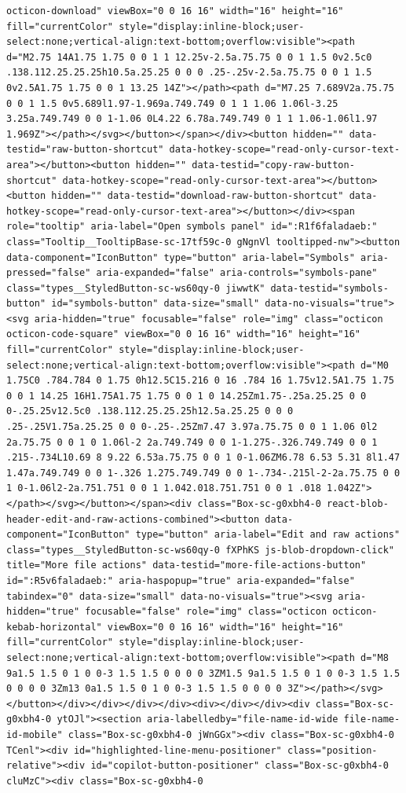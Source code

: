 \documentclass[
  letterpaper,
]{book}
\begin{document}
\begin{verbatim}
octicon-download" viewBox="0 0 16 16" width="16" height="16" fill="currentColor" style="display:inline-block;user-select:none;vertical-align:text-bottom;overflow:visible"><path d="M2.75 14A1.75 1.75 0 0 1 1 12.25v-2.5a.75.75 0 0 1 1.5 0v2.5c0 .138.112.25.25.25h10.5a.25.25 0 0 0 .25-.25v-2.5a.75.75 0 0 1 1.5 0v2.5A1.75 1.75 0 0 1 13.25 14Z"></path><path d="M7.25 7.689V2a.75.75 0 0 1 1.5 0v5.689l1.97-1.969a.749.749 0 1 1 1.06 1.06l-3.25 3.25a.749.749 0 0 1-1.06 0L4.22 6.78a.749.749 0 1 1 1.06-1.06l1.97 1.969Z"></path></svg></button></span></div><button hidden="" data-testid="raw-button-shortcut" data-hotkey-scope="read-only-cursor-text-area"></button><button hidden="" data-testid="copy-raw-button-shortcut" data-hotkey-scope="read-only-cursor-text-area"></button><button hidden="" data-testid="download-raw-button-shortcut" data-hotkey-scope="read-only-cursor-text-area"></button></div><span role="tooltip" aria-label="Open symbols panel" id=":R1f6faladaeb:" class="Tooltip__TooltipBase-sc-17tf59c-0 gNgnVl tooltipped-nw"><button data-component="IconButton" type="button" aria-label="Symbols" aria-pressed="false" aria-expanded="false" aria-controls="symbols-pane" class="types__StyledButton-sc-ws60qy-0 jiwwtK" data-testid="symbols-button" id="symbols-button" data-size="small" data-no-visuals="true"><svg aria-hidden="true" focusable="false" role="img" class="octicon octicon-code-square" viewBox="0 0 16 16" width="16" height="16" fill="currentColor" style="display:inline-block;user-select:none;vertical-align:text-bottom;overflow:visible"><path d="M0 1.75C0 .784.784 0 1.75 0h12.5C15.216 0 16 .784 16 1.75v12.5A1.75 1.75 0 0 1 14.25 16H1.75A1.75 1.75 0 0 1 0 14.25Zm1.75-.25a.25.25 0 0 0-.25.25v12.5c0 .138.112.25.25.25h12.5a.25.25 0 0 0 .25-.25V1.75a.25.25 0 0 0-.25-.25Zm7.47 3.97a.75.75 0 0 1 1.06 0l2 2a.75.75 0 0 1 0 1.06l-2 2a.749.749 0 0 1-1.275-.326.749.749 0 0 1 .215-.734L10.69 8 9.22 6.53a.75.75 0 0 1 0-1.06ZM6.78 6.53 5.31 8l1.47 1.47a.749.749 0 0 1-.326 1.275.749.749 0 0 1-.734-.215l-2-2a.75.75 0 0 1 0-1.06l2-2a.751.751 0 0 1 1.042.018.751.751 0 0 1 .018 1.042Z"></path></svg></button></span><div class="Box-sc-g0xbh4-0 react-blob-header-edit-and-raw-actions-combined"><button data-component="IconButton" type="button" aria-label="Edit and raw actions" class="types__StyledButton-sc-ws60qy-0 fXPhKS js-blob-dropdown-click" title="More file actions" data-testid="more-file-actions-button" id=":R5v6faladaeb:" aria-haspopup="true" aria-expanded="false" tabindex="0" data-size="small" data-no-visuals="true"><svg aria-hidden="true" focusable="false" role="img" class="octicon octicon-kebab-horizontal" viewBox="0 0 16 16" width="16" height="16" fill="currentColor" style="display:inline-block;user-select:none;vertical-align:text-bottom;overflow:visible"><path d="M8 9a1.5 1.5 0 1 0 0-3 1.5 1.5 0 0 0 0 3ZM1.5 9a1.5 1.5 0 1 0 0-3 1.5 1.5 0 0 0 0 3Zm13 0a1.5 1.5 0 1 0 0-3 1.5 1.5 0 0 0 0 3Z"></path></svg></button></div></div></div></div><div></div></div><div class="Box-sc-g0xbh4-0 ytOJl"><section aria-labelledby="file-name-id-wide file-name-id-mobile" class="Box-sc-g0xbh4-0 jWnGGx"><div class="Box-sc-g0xbh4-0 TCenl"><div id="highlighted-line-menu-positioner" class="position-relative"><div id="copilot-button-positioner" class="Box-sc-g0xbh4-0 cluMzC"><div class="Box-sc-g0xbh4-0 
\end{verbatim}
\end{document}
